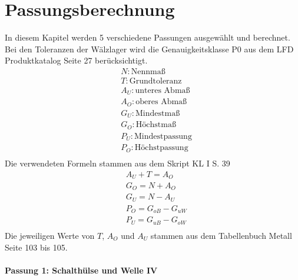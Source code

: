 \chapter{Passungsberechnung}
\flushleft
In diesem Kapitel werden 5 verschiedene Passungen ausgewählt und berechnet. Bei den Toleranzen der Wälzlager wird die Genauigkeitsklasse P0 aus dem LFD Produktkatalog Seite 27 berücksichtigt.
\begin{align*}
	&N : \text{Nennmaß} \\
	&T : \text{Grundtoleranz} \\
	&A_U : \text{unteres Abmaß} \\
	&A_O : \text{oberes Abmaß} \\
	&G_U : \text{Mindestmaß} \\
	&G_O : \text{Höchstmaß} \\
	&P_U : \text{Mindestpassung} \\
	&P_O : \text{Höchstpassung} \\
\end{align*}
Die verwendeten Formeln stammen aus dem Skript KL I S. 39
\begin{align*}
	&A_U + T = A_O \\
	&G_O = N + A_O \\
	&G_U = N - A_U \\
	&P_O = G_{oB} - G_{uW}\\
	&P_U = G_{uB} - G_{oW}\\
\end{align*}
Die jeweiligen Werte von $T$, $A_O$ und $A_U$ stammen aus dem Tabellenbuch Metall Seite 103 bis 105. 
\newpage
\subsubsection{Passung 1: Schalthülse und Welle IV}

